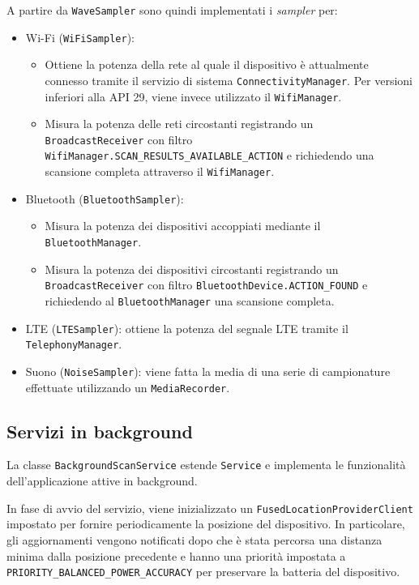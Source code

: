 \documentclass[11pt]{article}
\begin{document}
A partire da \texttt{WaveSampler} sono quindi implementati i \textit{sampler} per:
\begin{itemize}
  \item Wi-Fi (\texttt{WiFiSampler}): 
    \begin{itemize}[topsep=0em]
      \item Ottiene la potenza della rete al quale il dispositivo è attualmente connesso tramite il servizio di sistema \texttt{ConnectivityManager}. Per versioni inferiori alla API 29, viene invece utilizzato il \texttt{WifiManager}.
      \item Misura la potenza delle reti circostanti registrando un \texttt{BroadcastReceiver} con filtro \texttt{WifiManager.SCAN\_RESULTS\_AVAILABLE\_ACTION} e richiedendo una scansione completa attraverso il \texttt{WifiManager}.
    \end{itemize}
  \item Bluetooth (\texttt{BluetoothSampler}):
    \begin{itemize}[topsep=0em]
      \item Misura la potenza dei dispositivi accoppiati mediante il \texttt{BluetoothManager}.
      \item Misura la potenza dei dispositivi circostanti registrando un \texttt{BroadcastReceiver} con filtro \texttt{BluetoothDevice.ACTION\_FOUND} e richiedendo al \texttt{BluetoothManager} una scansione completa.
    \end{itemize}
  \item LTE (\texttt{LTESampler}): ottiene la potenza del segnale LTE tramite il \texttt{TelephonyManager}.
  \item Suono (\texttt{NoiseSampler}): viene fatta la media di una serie di campionature effettuate utilizzando un \texttt{MediaRecorder}.
\end{itemize}



\subsection{Servizi in background}
La classe \texttt{BackgroundScanService} estende \texttt{Service} e implementa le funzionalità dell'applicazione attive in background.

In fase di avvio del servizio, viene inizializzato un \texttt{FusedLocationProviderClient} impostato per fornire periodicamente la posizione del dispositivo. In particolare, gli aggiornamenti vengono notificati dopo che è stata percorsa una distanza minima dalla posizione precedente e hanno una priorità impostata a \texttt{PRIORITY\_BALANCED\_POWER\_ACCURACY} per preservare la batteria del dispositivo.
\end{document}
